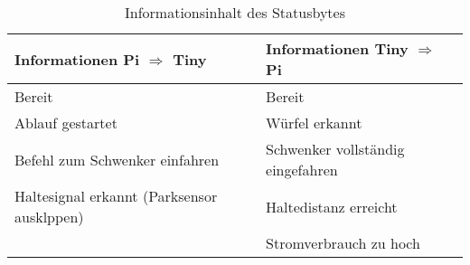 \documentclass[../../main.tex]{subfiles}
\begin{document}
        \begin{table}[H] \centering
            \begin{tabular}{|l|l|}
            \hline
            \textbf{Informationen Pi $\Rightarrow$ Tiny} & \textbf{Informationen Tiny $\Rightarrow$ Pi} \\ \hline
            Bereit                                       & Bereit                                       \\ \hline
            Ablauf gestartet                             & Würfel erkannt                               \\ \hline
            Befehl zum Schwenker einfahren               & Schwenker vollständig eingefahren            \\ \hline
            Haltesignal erkannt (Parksensor ausklppen)   & Haltedistanz erreicht                        \\ \hline
                                                         & Stromverbrauch zu hoch                       \\ \hline
            \end{tabular}
            \label{tab:statusInfo}
            \caption{Informationsinhalt des Statusbytes}

            \end{table}

    
\end{document}
